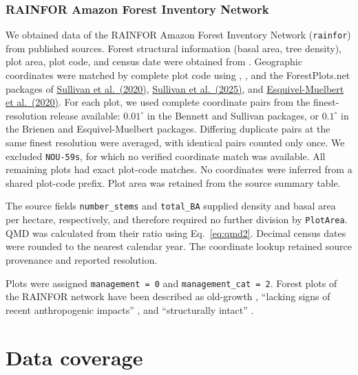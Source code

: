 \documentclass{myreport}
\begin{document}
% 

\subsubsection{RAINFOR Amazon Forest Inventory Network}
We obtained data of the RAINFOR Amazon Forest Inventory Network (\texttt{rainfor}) from published sources. Forest structural information (basal area, tree density), plot area, plot code, and census date were obtained from \citet{esquivelmuelbert25natplants}. Geographic coordinates were matched by complete plot code using \citet{bennett23natcc}, \citet{brienen_long-term_2015}, and the ForestPlots.net packages of \href{https://doi.org/10.5521/forestplots.net/2020_2}{Sullivan et al.\ (2020)}, \href{https://doi.org/10.5521/forestplots.net/2024_4}{Sullivan et al.\ (2025)}, and \href{https://doi.org/10.5521/forestplots.net/2020_6}{Esquivel-Muelbert et al.\ (2020)}. For each plot, we used complete coordinate pairs from the finest-resolution release available: $0.01^\circ$ in the Bennett and Sullivan packages, or $0.1^\circ$ in the Brienen and Esquivel-Muelbert packages. Differing duplicate pairs at the same finest resolution were averaged, with identical pairs counted only once. We excluded \texttt{NOU-59s}, for which no verified coordinate match was available. All remaining plots had exact plot-code matches. No coordinates were inferred from a shared plot-code prefix. Plot area was retained from the source summary table.

The source fields \texttt{number\_stems} and \texttt{total\_BA} supplied density and basal area per hectare, respectively, and therefore required no further division by \texttt{PlotArea}. QMD was calculated from their ratio using Eq.~\ref{eq:qmd2}. Decimal census dates were rounded to the nearest calendar year. The coordinate lookup retained source provenance and reported resolution.

Plots were assigned \texttt{management = 0} and \texttt{management\_cat = 2}. Forest plots of the RAINFOR network have been described as old-growth \citep{phillips09sci}, ``lacking signs of recent anthropogenic impacts'' \citep{brienen_long-term_2015}, and ``structurally intact'' \citep{bennett23natcc}.

% 

\clearpage

\section{Data coverage}
\label{sec:datacoverage}
\end{document}
